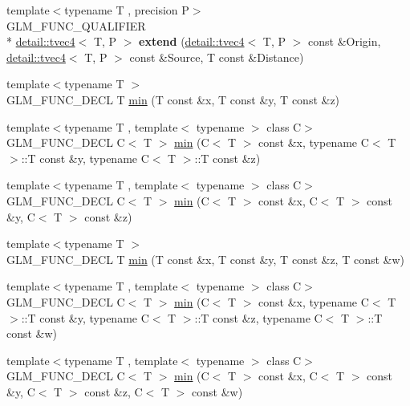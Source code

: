 \begin{DoxyCompactItemize}
\item 
\hypertarget{namespaceglm_a0d81de9b541fb273f3009b26e26e944e}{{\footnotesize template$<$typename T , precision P$>$ }\\G\-L\-M\-\_\-\-F\-U\-N\-C\-\_\-\-Q\-U\-A\-L\-I\-F\-I\-E\-R \\*
\hyperlink{structglm_1_1detail_1_1tvec4}{detail\-::tvec4}$<$ T, P $>$ {\bfseries extend} (\hyperlink{structglm_1_1detail_1_1tvec4}{detail\-::tvec4}$<$ T, P $>$ const \&Origin, \hyperlink{structglm_1_1detail_1_1tvec4}{detail\-::tvec4}$<$ T, P $>$ const \&Source, T const \&Distance)}\label{namespaceglm_a0d81de9b541fb273f3009b26e26e944e}

\item 
{\footnotesize template$<$typename T $>$ }\\G\-L\-M\-\_\-\-F\-U\-N\-C\-\_\-\-D\-E\-C\-L T \hyperlink{group__gtx__extented__min__max_ga713d3f9b3e76312c0d314e0c8611a6a6}{min} (T const \&x, T const \&y, T const \&z)
\item 
{\footnotesize template$<$typename T , template$<$ typename $>$ class C$>$ }\\G\-L\-M\-\_\-\-F\-U\-N\-C\-\_\-\-D\-E\-C\-L C$<$ T $>$ \hyperlink{group__gtx__extented__min__max_ga74d1a96e7cdbac40f6d35142d3bcbbd4}{min} (C$<$ T $>$ const \&x, typename C$<$ T $>$\-::T const \&y, typename C$<$ T $>$\-::T const \&z)
\item 
{\footnotesize template$<$typename T , template$<$ typename $>$ class C$>$ }\\G\-L\-M\-\_\-\-F\-U\-N\-C\-\_\-\-D\-E\-C\-L C$<$ T $>$ \hyperlink{group__gtx__extented__min__max_ga42b5c3fc027fd3d9a50d2ccc9126d9f0}{min} (C$<$ T $>$ const \&x, C$<$ T $>$ const \&y, C$<$ T $>$ const \&z)
\item 
{\footnotesize template$<$typename T $>$ }\\G\-L\-M\-\_\-\-F\-U\-N\-C\-\_\-\-D\-E\-C\-L T \hyperlink{group__gtx__extented__min__max_ga95466987024d03039607f09e69813d69}{min} (T const \&x, T const \&y, T const \&z, T const \&w)
\item 
{\footnotesize template$<$typename T , template$<$ typename $>$ class C$>$ }\\G\-L\-M\-\_\-\-F\-U\-N\-C\-\_\-\-D\-E\-C\-L C$<$ T $>$ \hyperlink{group__gtx__extented__min__max_ga4fe35dd31dd0c45693c9b60b830b8d47}{min} (C$<$ T $>$ const \&x, typename C$<$ T $>$\-::T const \&y, typename C$<$ T $>$\-::T const \&z, typename C$<$ T $>$\-::T const \&w)
\item 
{\footnotesize template$<$typename T , template$<$ typename $>$ class C$>$ }\\G\-L\-M\-\_\-\-F\-U\-N\-C\-\_\-\-D\-E\-C\-L C$<$ T $>$ \hyperlink{group__gtx__extented__min__max_ga7471ea4159eed8dd9ea4ac5d46c2fead}{min} (C$<$ T $>$ const \&x, C$<$ T $>$ const \&y, C$<$ T $>$ const \&z, C$<$ T $>$ const \&w)

\end{DoxyCompactItemize}
